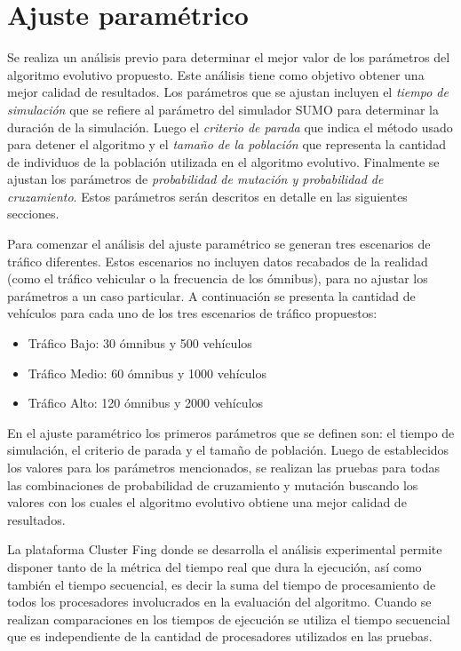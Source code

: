\section{Ajuste paramétrico}
Se realiza un análisis previo para determinar el mejor valor de los parámetros del algoritmo evolutivo propuesto. Este análisis tiene como objetivo obtener una mejor calidad de resultados. Los parámetros que se ajustan incluyen el \emph{tiempo de simulación} que se refiere al parámetro del simulador SUMO para determinar la duración de la simulación. Luego el \emph{criterio de parada} que indica el método usado para detener el algoritmo y el \emph{tamaño de la población} que representa la cantidad de individuos de la población utilizada en el algoritmo evolutivo. Finalmente se ajustan los parámetros de \emph{probabilidad de mutación y probabilidad de cruzamiento}. Estos parámetros serán descritos en detalle en las siguientes secciones.

Para comenzar el análisis del ajuste paramétrico se generan tres escenarios de tráfico diferentes. Estos escenarios no incluyen datos recabados de la realidad (como el tráfico vehicular o la frecuencia de los ómnibus), para no ajustar los parámetros a un caso particular.
A continuación se presenta la cantidad de vehículos para cada uno de los tres escenarios de tráfico propuestos:

\begin{itemize}
	\item Tráfico Bajo: 30 ómnibus y 500 vehículos	
	\item Tráfico Medio: 60 ómnibus y 1000 vehículos
	\item Tráfico Alto: 120 ómnibus y 2000 vehículos
\end{itemize}


En el ajuste paramétrico los primeros parámetros que se definen son: el tiempo de simulación, el criterio de parada y el tamaño de población. Luego de establecidos los valores para los parámetros mencionados, se realizan las pruebas para todas las combinaciones de probabilidad de cruzamiento y mutación buscando los valores con los cuales el algoritmo evolutivo obtiene una mejor calidad de resultados.

La plataforma Cluster Fing donde se desarrolla el análisis experimental permite disponer tanto de la métrica del tiempo real que dura la ejecución, así como también el tiempo secuencial, es decir la suma del tiempo de procesamiento de todos los procesadores involucrados en la evaluación del algoritmo. Cuando se realizan comparaciones en los tiempos de ejecución se utiliza el tiempo secuencial que es independiente de la cantidad de procesadores utilizados en las pruebas. 

